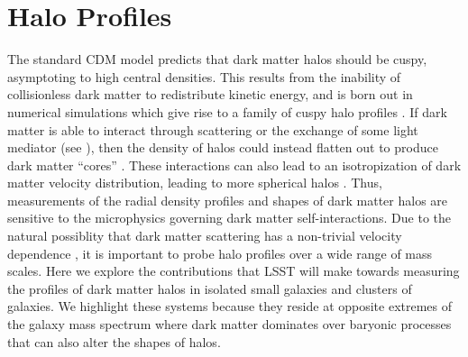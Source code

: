 \section{Halo Profiles} 
\label{sec:profiles}

The standard CDM model predicts that dark matter halos should be cuspy, asymptoting to high central densities.
This results from the inability of collisionless dark matter to redistribute kinetic energy, and is born out in numerical simulations which give rise to a family of cuspy halo profiles \citep[\eg, the NFW profile,][]{Navarro:1996gj}.
If dark matter is able to interact through scattering or the exchange of some light mediator (see ), then the density of halos could instead flatten out to produce dark matter ``cores'' \citep{Spergel:1999mh}.
These interactions can also lead to an isotropization of dark matter velocity distribution, leading to more spherical halos \citep{Peter:2013}.
Thus, measurements of the radial density profiles and shapes of dark matter halos are sensitive to the microphysics governing dark matter self-interactions.
Due to the natural possiblity that dark matter scattering has a non-trivial velocity dependence , it is important to probe halo profiles over a wide range of mass scales.
Here we explore the contributions that LSST will make towards measuring the profiles of dark matter halos in isolated small galaxies and clusters of galaxies.
We highlight these systems because they reside at opposite extremes of the galaxy mass spectrum where dark matter dominates over baryonic processes that can also alter the shapes of halos.



% 
% 

